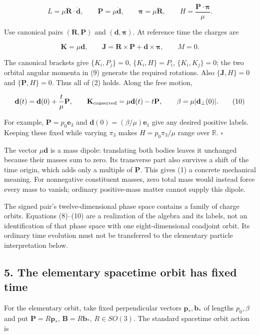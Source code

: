 \documentclass[11pt,a4paper]{article}
\begin{document}
\[
L=\mu\dot{\mathbf R}\cdot\dot{\mathbf d},\qquad
\mathbf P=\mu\dot{\mathbf d},\qquad
\boldsymbol\pi=\mu\dot{\mathbf R},\qquad
H=\frac{\mathbf P\cdot\boldsymbol\pi}{\mu}. \tag{8}
\]

Use canonical pairs \((\mathbf R,\mathbf P)\) and
\((\mathbf d,\boldsymbol\pi)\). At reference time the charges are

\[
\mathbf K=\mu\mathbf d,\qquad
\mathbf J=\mathbf R\times\mathbf P+\mathbf d\times\boldsymbol\pi,
\qquad M=0. \tag{9}
\]

The canonical brackets give \(\{K_i,P_j\}=0\), \(\{K_i,H\}=P_i\),
\(\{K_i,K_j\}=0\); the two orbital angular momenta in (9) generate the
required rotations. Also \(\{\mathbf J,H\}=0\) and
\(\{\mathbf P,H\}=0\). Thus all of (2) holds. Along the free motion,

\[
\mathbf d(t)=\mathbf d(0)+\frac{t}{\mu}\mathbf P,
\qquad \mathbf K_{\rm conserved}=\mu\mathbf d(t)-t\mathbf P,
\qquad \beta=\mu|\mathbf d_\perp(0)|. \tag{10}
\]

For example, \(\mathbf P=p_0\mathbf e_3\) and
\(\mathbf d(0)=(\beta/\mu)\mathbf e_1\) give any desired positive
labels. Keeping these fixed while varying \(\pi_3\) makes
\(H=p_0\pi_3/\mu\) range over \(\mathbb R\). \(\square\)

The vector \(\mu\mathbf d\) is a mass dipole: translating both bodies
leaves it unchanged because their masses sum to zero. Its transverse
part also survives a shift of the time origin, which adds only a
multiple of \(\mathbf P\). This gives (1) a concrete mechanical meaning.
For nonnegative constituent masses, zero total mass would instead force
every mass to vanish; ordinary positive-mass matter cannot supply this
dipole.

The signed pair's twelve-dimensional phase space contains a family of
charge orbits. Equations (8)--(10) are a realization of the algebra and
its labels, not an identification of that phase space with one
eight-dimensional coadjoint orbit. Its ordinary time evolution must not
be transferred to the elementary particle interpretation below.

\hypertarget{the-elementary-spacetime-orbit-has-fixed-time}{%
\subsection{5. The elementary spacetime orbit has fixed
time}\label{the-elementary-spacetime-orbit-has-fixed-time}}

For the elementary orbit, take fixed perpendicular vectors
\(\mathbf p_*,\mathbf b_*\) of lengths \(p_0,\beta\) and put
\(\mathbf P=R\mathbf p_*\), \(\mathbf B=R\mathbf b_*\), \(R\in SO(3)\).
The standard spacetime orbit action is
\end{document}
